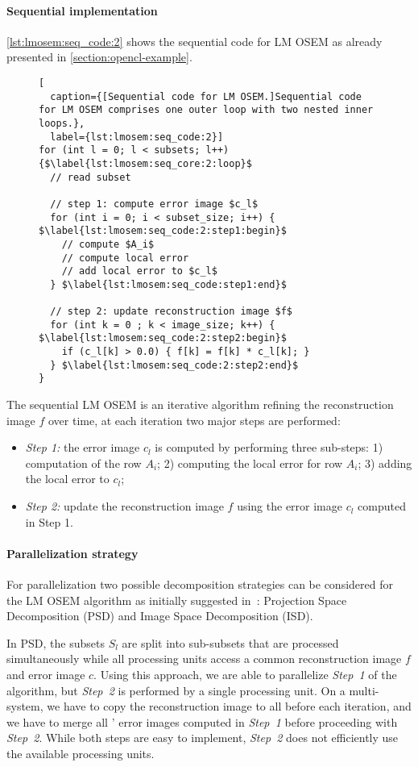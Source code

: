 \paragraph{Sequential implementation}
\autoref{lst:lmosem:seq_code:2} shows the sequential code for LM OSEM as already presented in \autoref{section:opencl-example}.
%
\begin{figure}
\begin{lstlisting}[
  caption={[Sequential code for LM OSEM.]Sequential code for LM OSEM comprises one outer loop with two nested inner loops.},
  label={lst:lmosem:seq_code:2}]
for (int l = 0; l < subsets; l++) {$\label{lst:lmosem:seq_core:2:loop}$
  // read subset

  // step 1: compute error image $c_l$
  for (int i = 0; i < subset_size; i++) { $\label{lst:lmosem:seq_code:2:step1:begin}$
    // compute $A_i$
    // compute local error
    // add local error to $c_l$
  } $\label{lst:lmosem:seq_code:step1:end}$

  // step 2: update reconstruction image $f$
  for (int k = 0 ; k < image_size; k++) { $\label{lst:lmosem:seq_code:2:step2:begin}$
    if (c_l[k] > 0.0) { f[k] = f[k] * c_l[k]; }
  } $\label{lst:lmosem:seq_code:2:step2:end}$
}
\end{lstlisting}
\end{figure}
%
The sequential LM OSEM is an iterative algorithm refining the reconstruction image $f$ over time, at each iteration two major steps are performed:
\begin{itemize}
  \item[] \emph{Step 1:} the error image $c_l$ is computed by performing three sub-steps: 1) computation of the row $A_i$; 2) computing the local error for row $A_i$; 3) adding the local error to $c_l$;
  \item[] \emph{Step 2:} update the reconstruction image $f$ using the error image $c_l$ computed in Step 1.
\end{itemize}

\paragraph{Parallelization strategy}
For parallelization two possible decomposition strategies can be considered for the LM OSEM algorithm as initially suggested in~\cite{JonesJoKeNeReLeByBaMiCa2002}: Projection Space Decomposition (PSD) and Image Space Decomposition (ISD).

In PSD, the subsets $S_l$ are split into sub-subsets that are processed simultaneously while all processing units access a common reconstruction image $f$ and error image $c$.
Using this approach, we are able to parallelize \emph{Step~1} of the algorithm, but \emph{Step~2} is performed by a single processing unit.
On a multi-\GPU system, we have to copy the reconstruction image to all \GPUs before each iteration, and we have to merge all \GPUs' error images computed in \emph{Step~1} before proceeding with \emph{Step~2}.
While both steps are easy to implement, \emph{Step~2} does not efficiently use the available processing units.

